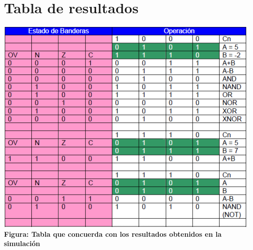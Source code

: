 \documentclass[12pt,executivepaper]{article}
\begin{document}
\section{Tabla de resultados}
\begin{center}
    \includegraphics[scale=0.666]{imgs/tabla.png}\\
    \textbf{Figura: Tabla que concuerda con los resultados obtenidos en la simulación}
\end{center}
\clearpage
\end{document}
